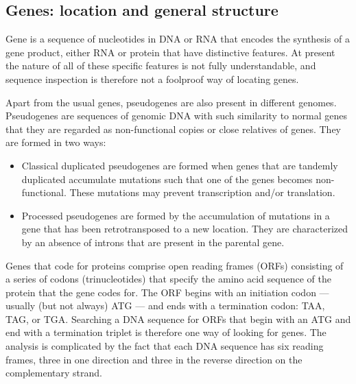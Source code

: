 \subsection{Genes: location and general structure}
Gene is a sequence of nucleotides in DNA or RNA that encodes the synthesis of a gene product, either RNA or protein that have distinctive features. 
At present the nature of all of these specific features is not fully understandable, and sequence inspection is therefore not a foolproof way of locating genes\cite{Genomes3}.

Apart from the usual genes, pseudogenes are also present in different genomes.
Pseudogenes are sequences of genomic DNA with such similarity to normal genes that they are regarded as non-functional copies or close relatives of genes\cite{PrinciplesOfGeneManipulation}. 
They are formed in two ways:
\begin{itemize}
	\item Classical duplicated pseudogenes are formed when genes that are tandemly duplicated accumulate mutations such that one of the genes becomes non-functional.
	These mutations may prevent transcription and/or translation.
	\item Processed pseudogenes are formed by the accumulation of mutations in a gene that has been retrotransposed to a new location. 
	They are characterized by an absence of introns that are present in the parental gene.
\end{itemize} 

Genes that code for proteins comprise open reading frames (ORFs) consisting of a series of codons (trinucleotides) that specify the amino acid sequence of the protein that the gene codes for. 
The ORF begins with an initiation codon — usually (but not always) ATG — and ends with a termination codon: TAA, TAG, or TGA. 
Searching a DNA sequence for ORFs that begin with an ATG and end with a termination triplet is therefore one way of looking for genes. 
The analysis is complicated by the fact that each DNA sequence has six reading frames, three in one direction and three in the reverse direction on the complementary strand.

